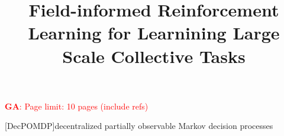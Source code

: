 \documentclass[conference]{IEEEtran}
\begin{document}
%
\title{Field-informed Reinforcement Learning for Learnining Large Scale Collective Tasks} %
%

\author{

\and
{}
\and
{}
}
%
\maketitle              %
%

\newcommand{\meta}[3]{\textcolor{#1}{\textbf{#2}: #3}}
\newcommand{\ga}[1]{\meta{red}{GA}{#1}}
\newcommand{\lukas}[1]{\meta{purple}{Lukas}{#1}}
\newcommand{\mv}[1]{\meta{green}{MV}{#1}}
\ga{Page limit: 10 pages (include refs)}

[DecPOMDP]{decentralized partially observable Markov decision processes}
\end{document}

